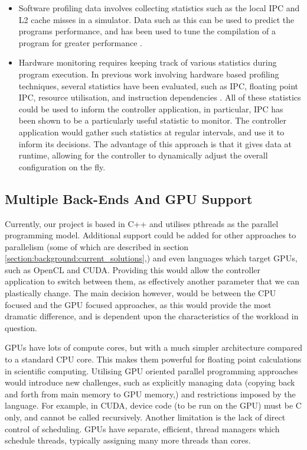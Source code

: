 \begin{itemize}
    \item Software profiling data involves collecting statistics such as the local IPC and L2 cache misses in a simulator. Data such as this can be used to predict the programs performance, and has been used to tune the compilation of a program for greater performance \cite{duesterwald_bala_2000}.
    
    \item Hardware monitoring requires keeping track of various statistics during program execution. In previous work involving hardware based profiling techniques, several statistics have been evaluated, such as IPC, floating point IPC, resource utilisation, and instruction dependencies \cite{bahar_manne_2001, buyuktosunoglu_schuster_brooks_bose_cook_albonesi_2001, folegnani_gonzalez, maro_bai_bahar_2001, ponomarev_kucuk_ghose, sasanka_hughes_adve_2002, seng_tune_tullsen}. All of these statistics could be used to inform the controller application, in particular, IPC has been shown to be a particularly useful statistic to monitor. The controller application would gather such statistics at regular intervals, and use it to inform its decisions. The advantage of this approach is that it gives data at runtime, allowing for the controller to dynamically adjust the overall configuration on the fly.
\end{itemize}



\subsection{Multiple Back-Ends And GPU Support}
\label{section:conclusion_and_future_work:multiple_backends_and_gpu_support}

Currently, our project is based in C++ and utilises pthreads as the parallel programming model. Additional support could be added for other approaches to parallelism (some of which are described in section \ref{section:background:current_solutions},) and even languages which target GPUs, such as OpenCL and CUDA. Providing this would allow the controller application to switch between them, as effectively another parameter that we can plastically change. The main decision however, would be between the CPU focused and the GPU focused approaches, as this would provide the most dramatic difference, and is dependent upon the characteristics of the workload in question.

GPUs have lots of compute cores, but with a much simpler architecture compared to a standard CPU core. This makes them powerful for floating point calculations in scientific computing. Utilising GPU oriented parallel programming approaches would introduce new challenges, such as explicitly managing data (copying back and forth from main memory to GPU memory,) and restrictions imposed by the language. For example, in CUDA, device code (to be run on the GPU) must be C only, and cannot be called recursively. Another limitation is the lack of direct control of scheduling. GPUs have separate, efficient, thread managers which schedule threads, typically assigning many more threads than cores.



